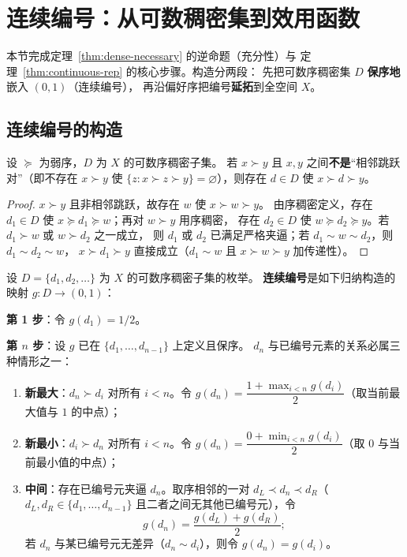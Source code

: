 \section{连续编号：从可数稠密集到效用函数}\label{sec:numbering}

本节完成定理~\ref{thm:dense-necessary} 的逆命题（充分性）与
定理~\ref{thm:continuous-rep} 的核心步骤。构造分两段：
先把可数序稠密集 $D$ \textbf{保序地}嵌入 $(0,1)$（连续编号），
再沿偏好序把编号\textbf{延拓}到全空间 $X$。

\subsection{连续编号的构造}

\begin{lemma}[插值引理]\label{lem:interp}
设 $\succeq$ 为弱序，$D$ 为 $X$ 的可数序稠密子集。
若 $x\succ y$ 且 $x,y$ 之间\textbf{不是}“相邻跳跃对”（即不存在 $x\succ y$ 使
$\{z:x\succ z\succ y\}=\varnothing$），则存在 $d\in D$ 使 $x\succ d\succ y$。
\end{lemma}

\begin{proof}
$x\succ y$ 且非相邻跳跃，故存在 $w$ 使 $x\succ w\succ y$。
由序稠密定义，存在 $d_1\in D$ 使 $x\succeq d_1\succeq w$；再对 $w\succ y$ 用序稠密，
存在 $d_2\in D$ 使 $w\succeq d_2\succeq y$。若 $d_1\succ w$ 或 $w\succ d_2$ 之一成立，
则 $d_1$ 或 $d_2$ 已满足严格夹逼；若 $d_1\sim w\sim d_2$，则 $d_1\sim d_2\sim w$，
$x\succ d_1\succ y$ 直接成立（$d_1\sim w$ 且 $x\succ w\succ y$ 加传递性）。
\end{proof}

\begin{definition}[连续编号]\label{def:cont-num}
设 $D=\{d_1,d_2,\dots\}$ 为 $X$ 的可数序稠密子集的枚举。
\textbf{连续编号}是如下归纳构造的映射 $g:D\to(0,1)$：

\textbf{第 1 步}：令 $g(d_1)=1/2$。

\textbf{第 $n$ 步}：设 $g$ 已在 $\{d_1,\dots,d_{n-1}\}$ 上定义且保序。
$d_n$ 与已编号元素的关系必属三种情形之一：
\begin{enumerate}
  \item \textbf{新最大}：$d_n\succ d_i$ 对所有 $i<n$。令
        $g(d_n)=\dfrac{1+\max_{i<n}g(d_i)}{2}$（取当前最大值与 $1$ 的中点）；
  \item \textbf{新最小}：$d_i\succ d_n$ 对所有 $i<n$。令
        $g(d_n)=\dfrac{0+\min_{i<n}g(d_i)}{2}$（取 $0$ 与当前最小值的中点）；
  \item \textbf{中间}：存在已编号元夹逼 $d_n$。取序相邻的一对
        $d_L\prec d_n\prec d_R$（$d_L,d_R\in\{d_1,\dots,d_{n-1}\}$ 且二者之间无其他已编号元），令
        \[
        g(d_n)=\frac{g(d_L)+g(d_R)}{2};
        \]
        若 $d_n$ 与某已编号元无差异（$d_n\sim d_i$），则令 $g(d_n)=g(d_i)$。
\end{enumerate}
\end{definition}

